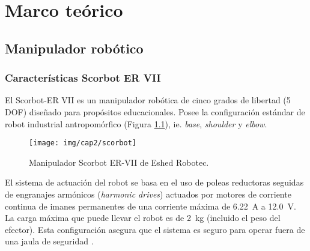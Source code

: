 \chapter{Marco teórico}

\section{Manipulador robótico}

\subsection{Características Scorbot ER VII}

El Scorbot-ER VII es un  manipulador robótica de cinco grados de libertad (5 DOF) diseñado para propósitos educacionales. Posee la configuración estándar de robot industrial antropomórfico (Figura \ref{cap2_scorbot}), ie. \textit{base}, \textit{shoulder} y \textit{elbow}.

\begin{figure}[ht]
  \centering
  \texttt{[image: img/cap2/scorbot]}
  \caption{Manipulador Scorbot ER-VII de Eshed Robotec.}
  \label{cap2_scorbot}
\end{figure}

El sistema de actuación del robot se basa en el uso de poleas reductoras seguidas de engranajes armónicos (\textit{harmonic drives}) actuados por motores de corriente continua de imanes permanentes de una corriente máxima de \SI{6,22}{\ampere} a \SI{12,0}{\volt}. La carga máxima que puede llevar el robot es de \SI{2}{\kilo\gram} (incluido el peso del efector). Esta configuración asegura que el sistema es seguro para operar fuera de una jaula de seguridad \cite{scorbot1998}.


